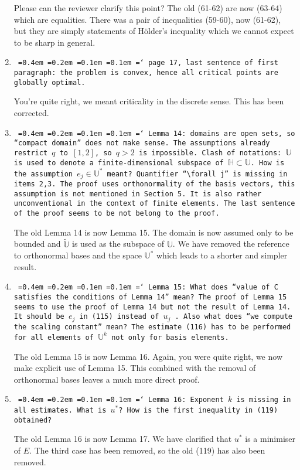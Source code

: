 \documentclass[12pt]{article}
\newcommand*\justify{%
	\fontdimen2\font=0.4em%
	\fontdimen3\font=0.2em%
	\fontdimen4\font=0.1em%
	\fontdimen7\font=0.1em%
	\hyphenchar\font=`\-%
}
\newcommand{\review}[1]{\texttt{\justify{#1}}}
\newcommand{\F}[1]{\mathbb{#1}}
\begin{document}
\begin{enumerate}
	Please can the reviewer clarify this point? The old (61-62) are now (63-64) which are equalities. There was a pair of inequalities (59-60), now (61-62), but they are simply statements of H\"older's inequality which we cannot expect to be sharp in general.
	
	\item \review{page 17, last sentence of first paragraph: the problem is convex, hence all critical points are globally optimal.}
	
	You're quite right, we meant criticality in the discrete sense. This has been corrected.
	
	\item \review{Lemma 14: domains are open sets, so ``compact domain'' does not make sense. The assumptions already restrict $q$ to $[1, 2]$, so $q > 2$ is impossible. Clash of notations: $\mathbb U$ is used to denote a finite-dimensional subspace of $\mathbb H \subset \mathbb U$. How is the assumption $e_j \in \mathbb U^*$ meant? Quantifier ``$\forall j$'' is missing in items 2,3. The proof uses orthonormality of the basis vectors, this assumption is not mentioned in Section 5. It is also rather unconventional in the context of finite elements. The last sentence of the proof seems to be not belong to the proof.}
	
	The old Lemma 14 is now Lemma 15. The domain is now assumed only to be bounded and $\tilde{\F{U}}$ is used as the subspace of $\F U$. We have removed the reference to orthonormal bases and the space $\F{U}^*$ which leads to a shorter and simpler result. 
		
	\item \review{Lemma 15: What does ``value of $C$ satisfies the conditions of Lemma 14'' mean? The proof of Lemma 15 seems to use the proof of Lemma 14 but not the result of Lemma 14. It should be $e_j$ in (115) instead of $u_j$ . Also what does ``we compute the scaling constant'' mean? The estimate (116) has to be performed for all elements of $\mathbb U^k$ not only for basis elements.}
	
	The old Lemma 15 is now Lemma 16. Again, you were quite right, we now make explicit use of Lemma 15. This combined with the removal of orthonormal bases leaves a much more direct proof.
	
	\item \review{Lemma 16: Exponent $k$ is missing in all estimates. What is $u^*$? How is the first inequality in (119) obtained?}
	
	The old Lemma 16 is now Lemma 17. We have clarified that $u^*$ is a minimiser of $E$. The third case has been removed, so the old (119) has also been removed.
\end{enumerate}
\end{document}
